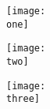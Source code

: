 \documentclass{article}
\providecommand\one{lanyard.pdf}
\providecommand\two{}
\providecommand\three{}
\begin{document}
\begin{center}
  \texttt{[image: \\one]}

  \vspace{2em}

  {%
    \ifthenelse{\equal{\two}{}}
    {}
    {\texttt{[image: \\two]}}
  }

  \vspace{2em}

  {%
    \ifthenelse{\equal{\three}{}}
    {}
    {\texttt{[image: \\three]}}
  }

\end{center}
\end{document}
